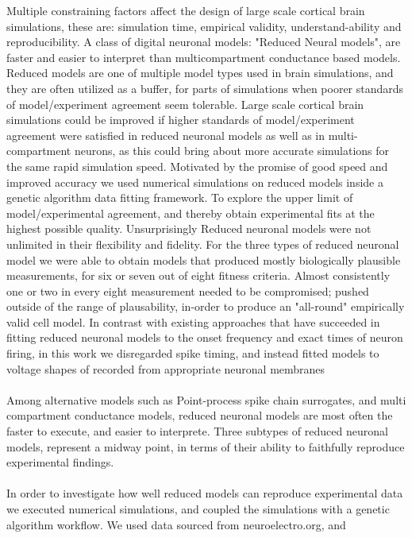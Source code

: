 
Multiple constraining factors affect the design of large scale cortical brain simulations, these are: simulation time, empirical validity, understand-ability and reproducibility. A class of digital neuronal models: "Reduced Neural models", are faster and easier to interpret than multicompartment conductance based models. Reduced models are one of multiple model types used in brain simulations, and they are often utilized as a buffer, for parts of simulations when poorer standards of model/experiment agreement seem tolerable. Large scale cortical brain simulations could be improved if higher standards of model/experiment agreement were satisfied in reduced neuronal models as well as in multi-compartment neurons, as this could bring about more accurate simulations for the same rapid simulation speed. Motivated by the promise of good speed and improved accuracy we used numerical simulations on reduced models inside a genetic algorithm data fitting framework. To explore the upper limit of model/experimental agreement, and thereby obtain experimental fits at the highest possible quality. Unsurprisingly Reduced neuronal models were not unlimited in their flexibility and fidelity. For the three types of reduced neuronal model we were able to obtain models that produced mostly biologically plausible measurements, for six or seven out of eight fitness criteria. Almost consistently one or two in every eight measurement needed to be compromised; pushed outside of the range of plausability, in-order to produce an "all-round" empirically valid cell model. In contrast with existing approaches that have succeeded in fitting reduced neuronal models to the onset frequency and exact times of neuron firing, in this work we disregarded spike timing, and instead fitted models to voltage shapes of recorded from appropriate neuronal membranes\\
\\ 
Among alternative models such as Point-process spike chain surrogates, and  multi compartment conductance models, reduced neuronal models are most often the faster to execute, and easier to interprete. Three subtypes of reduced neuronal models, represent a midway point, in terms of their ability to faithfully reproduce experimental findings.\\
\\
In order to investigate how well reduced models can reproduce experimental data we executed numerical simulations, and coupled the simulations with a genetic algorithm workflow. We used data sourced from neuroelectro.org, and 

